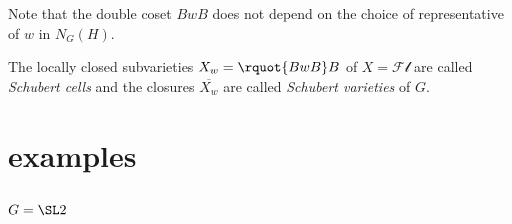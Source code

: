 \documentclass[english, no-theorem-numbers]{short-notes}
\begin{document}
Note that the double coset $BwB$ does not depend on the choice of representative of $w$ in $N_G(H)$.

\begin{Def}
    The locally closed subvarieties $X_w = \rquot{BwB}B$ of $X = \mathcal{Fl}$ are called \emph{Schubert cells} and the closures $\overline{X_w}$ are called \emph{Schubert varieties} of $G$.
\end{Def}

\section*{examples}

\subsection*{\texorpdfstring{$G = \SL2$}{G = SL2}}
\end{document}
